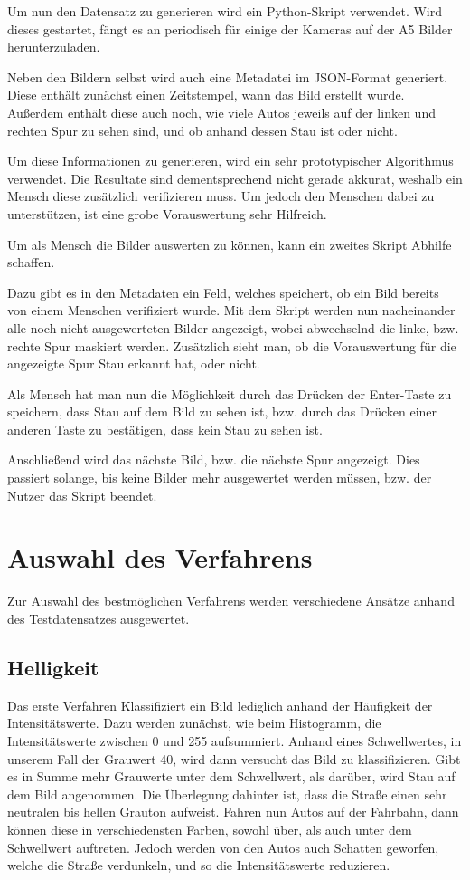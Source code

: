 
Um nun den Datensatz zu generieren wird ein Python-Skript verwendet.
Wird dieses gestartet, fängt es an periodisch für einige der Kameras auf der A5 Bilder herunterzuladen.

Neben den Bildern selbst wird auch eine Metadatei im JSON-Format generiert.
Diese enthält zunächst einen Zeitstempel, wann das Bild erstellt wurde.
Außerdem enthält diese auch noch, wie viele Autos jeweils auf der linken und rechten Spur zu sehen sind, und ob anhand dessen Stau ist oder nicht.

Um diese Informationen zu generieren, wird ein sehr prototypischer Algorithmus verwendet. Die Resultate sind dementsprechend nicht gerade akkurat, weshalb ein Mensch diese zusätzlich verifizieren muss. Um jedoch den Menschen dabei zu unterstützen, ist eine grobe Vorauswertung sehr Hilfreich.

Um als Mensch die Bilder auswerten zu können, kann ein zweites Skript Abhilfe schaffen.

Dazu gibt es in den Metadaten ein Feld, welches speichert, ob ein Bild bereits von einem Menschen verifiziert wurde.
Mit dem Skript werden nun nacheinander alle noch nicht ausgewerteten Bilder angezeigt, wobei abwechselnd die linke, bzw. rechte Spur maskiert werden. Zusätzlich sieht man, ob die Vorauswertung für die angezeigte Spur Stau erkannt hat, oder nicht.

Als Mensch hat man nun die Möglichkeit durch das Drücken der Enter-Taste zu speichern, dass Stau auf dem Bild zu sehen ist, bzw. durch das Drücken einer anderen Taste zu bestätigen, dass kein Stau zu sehen ist.

Anschließend wird das nächste Bild, bzw. die nächste Spur angezeigt.
Dies passiert solange, bis keine Bilder mehr ausgewertet werden müssen, bzw. der Nutzer das Skript beendet.

\section{Auswahl des Verfahrens}
Zur Auswahl des bestmöglichen Verfahrens werden verschiedene Ansätze anhand des Testdatensatzes ausgewertet.

\subsection{Helligkeit}
Das erste Verfahren Klassifiziert ein Bild lediglich anhand der Häufigkeit der Intensitätswerte.
Dazu werden zunächst, wie beim Histogramm, die Intensitätswerte zwischen 0 und 255 aufsummiert.
Anhand eines Schwellwertes, in unserem Fall der Grauwert 40, wird dann versucht das Bild zu klassifizieren.
Gibt es in Summe mehr Grauwerte unter dem Schwellwert, als darüber, wird Stau auf dem Bild angenommen.
Die Überlegung dahinter ist, dass die Straße einen sehr neutralen bis hellen Grauton aufweist. Fahren nun Autos auf der Fahrbahn, dann können diese in verschiedensten Farben, sowohl über, als auch unter dem Schwellwert auftreten.
Jedoch werden von den Autos auch Schatten geworfen, welche die Straße verdunkeln, und so die Intensitätswerte reduzieren.
	
